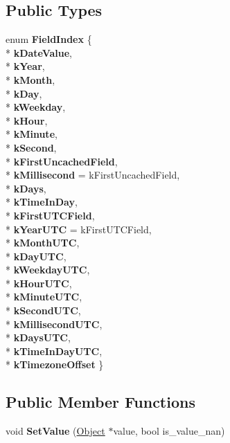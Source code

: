 \subsection*{Public Types}
\begin{DoxyCompactItemize}
\item 
enum {\bfseries Field\+Index} \{ \\*
{\bfseries k\+Date\+Value}, 
\\*
{\bfseries k\+Year}, 
\\*
{\bfseries k\+Month}, 
\\*
{\bfseries k\+Day}, 
\\*
{\bfseries k\+Weekday}, 
\\*
{\bfseries k\+Hour}, 
\\*
{\bfseries k\+Minute}, 
\\*
{\bfseries k\+Second}, 
\\*
{\bfseries k\+First\+Uncached\+Field}, 
\\*
{\bfseries k\+Millisecond} = k\+First\+Uncached\+Field, 
\\*
{\bfseries k\+Days}, 
\\*
{\bfseries k\+Time\+In\+Day}, 
\\*
{\bfseries k\+First\+U\+T\+C\+Field}, 
\\*
{\bfseries k\+Year\+U\+TC} = k\+First\+U\+T\+C\+Field, 
\\*
{\bfseries k\+Month\+U\+TC}, 
\\*
{\bfseries k\+Day\+U\+TC}, 
\\*
{\bfseries k\+Weekday\+U\+TC}, 
\\*
{\bfseries k\+Hour\+U\+TC}, 
\\*
{\bfseries k\+Minute\+U\+TC}, 
\\*
{\bfseries k\+Second\+U\+TC}, 
\\*
{\bfseries k\+Millisecond\+U\+TC}, 
\\*
{\bfseries k\+Days\+U\+TC}, 
\\*
{\bfseries k\+Time\+In\+Day\+U\+TC}, 
\\*
{\bfseries k\+Timezone\+Offset}
 \}\hypertarget{classv8_1_1internal_1_1_j_s_date_afc7907b14eb9ef9499498c3b1e19e379}{}\label{classv8_1_1internal_1_1_j_s_date_afc7907b14eb9ef9499498c3b1e19e379}

\end{DoxyCompactItemize}
\subsection*{Public Member Functions}
\begin{DoxyCompactItemize}
\item 
void {\bfseries Set\+Value} (\hyperlink{classv8_1_1internal_1_1_object}{Object} $\ast$value, bool is\+\_\+value\+\_\+nan)\hypertarget{classv8_1_1internal_1_1_j_s_date_a23103dbde943e9378b3dcaa836195066}{}\label{classv8_1_1internal_1_1_j_s_date_a23103dbde943e9378b3dcaa836195066}

\end{DoxyCompactItemize}
